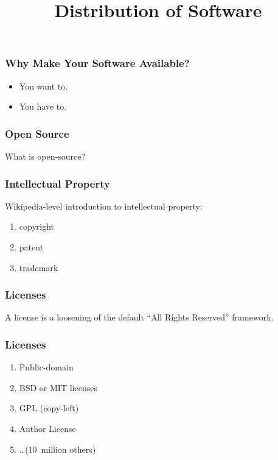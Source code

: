 
\title{Distribution of Software}

\frame{\maketitle}

\begin{frame}[fragile]
\frametitle{Why Make Your Software Available?}

\begin{itemize}
\item You \alert{want} to.
\item You \alert{have} to.
\end{itemize}
%
\end{frame}

\begin{frame}[fragile]
\frametitle{Open Source}
What is open-source?
\end{frame}

\begin{frame}[fragile]
\frametitle{Intellectual Property}
Wikipedia-level introduction to intellectual property:
\begin{enumerate}
\item copyright
\item patent 
\item trademark
\end{enumerate}
\end{frame}

\begin{frame}[fragile]
\frametitle{Licenses}
A license is a \alert{loosening} of the default ``All Rights Reserved'' framework.
\end{frame}

\begin{frame}[fragile]
\frametitle{Licenses}
\begin{enumerate}
\item Public-domain
\item BSD or MIT licenses
\item GPL (copy-left)
\item Author License
\item \ldots (10~million others)
\end{enumerate}
\end{frame}

